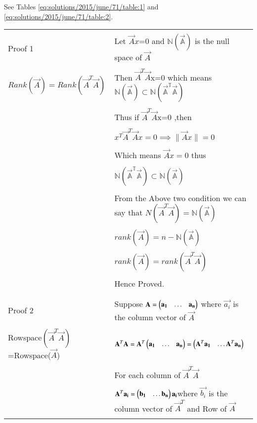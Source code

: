 See Tables     \ref{eq:solutions/2015/june/71/table:1}
and     \ref{eq:solutions/2015/june/71/table:2}.

\onecolumn
\begin{longtable}{|l|l|}
	\hline
	\multirow{3}{*}{Proof 1}	& \\
	&Let $\vec{A}x$=0 and $\mathbb{N(\vec{A})}$ is the null space of $\vec{A}$\\
	&\\
	$Rank(\vec{A})=Rank(\vec{A}^T\vec{A})$&Then $\vec{A}^T\vec{A}$x=0 which means $\mathbb{N(\vec{A})}\subset \mathbb{N(\vec{A}^T\vec{A})}$ \\
	&\\
	&Thus if $\vec{A}^T\vec{A}$x=0 ,then\\
	&\\
	&$x^T\vec{A}^T\vec{A}x=0\implies\lVert\vec{A}x\rVert=0$\\
	&\\
	&Which means $\vec{A}x=0$ thus\\
	&\\
	& $\mathbb{N(\vec{A}^T\vec{A})}\subset\mathbb{N(\vec{A})}$\\
	&\\
	&From the Above two condition we can say that ${N(\vec{A}^T\vec{A})}=\mathbb{N(\vec{A})}$\\
	&\\
	&$rank(\vec{A})=n-\mathbb{N(\vec{A})}$\\
	&\\
	&$rank(\vec{A})=rank(\vec{A}^T\vec{A})$\\
	&\\
	&Hence Proved.\\
	&\\
	\hline
	\multirow{3}{*}{Proof 2} 
	&\\
	&Suppose $\mathbf{A}=\begin{pmatrix}\mathbf{a_1}&\hdots&\mathbf{a_n}\end{pmatrix}$ where $\vec{a_i}$ is the column vector of $\vec{A}$\\
	&\\
	Rowspace$(\vec{A}^T\vec{A})$=Rowspace($\vec{A}$) & $\mathbf{A}^T\mathbf{A}=\mathbf{A}^T\begin{pmatrix}\mathbf{a_1}&\hdots&\mathbf{a_n}\end{pmatrix}=\begin{pmatrix}\mathbf{A}^T\mathbf{a_1}&\hdots\mathbf{A}^T\mathbf{a_n}\end{pmatrix}$\\
	&\\
	&For each column of $\vec{A}^T\vec{A}$\\
	&\\
	&$\mathbf{A}^T\mathbf{a_i}=\begin{pmatrix}\mathbf{b_1}&\hdots\mathbf{b_n}\end{pmatrix}\mathbf{a_i}$where $\vec{b_i}$ is the column vector of $\vec{A}^T$ and Row of $\vec{A}$\\
	&\\

\end{longtable}
